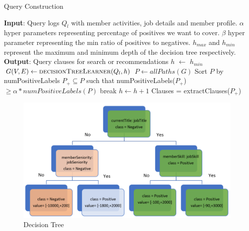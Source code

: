 \begin{algorithm}
\caption{Query Construction}\label{alg:query-construction}
\begin{algorithmic}[1]

    \State \textbf{Input}: Query logs $Q_l$ with member activities, job details
    and member profile. $\alpha$ hyper parameters representing
    percentage of positives we want to cover. $\beta$ hyper parameter
    representing the min ratio of positives to negatives. $h_{max}$ and $h_{min}$ represent
    the maximum and minimum depth of the decision tree respectively.
    \State \textbf{Output}: Query clauses for search or recommendations
        \State $h$ $\gets$ $h_{min}$
            \State $G(V,E) \gets \Call{decisionTreeLearner}{Q_l, h}$
            \State $P \gets allPaths(G)$
            \State Sort $P$ by numPositiveLabels
            \State $P_{+} \subseteq P$ such that numPositiveLabels($P_+$) $\geq \alpha * numPositiveLabels(P)$
            \State 
                \State break     
            \EndIf
            $h \gets h + 1$
            \State 
        \EndWhile
        Clauses = extractClauses($P_+$)

    \EndFunction

\end{algorithmic}
\end{algorithm}



\begin{figure}
\centering
    \includegraphics[width=\textwidth]{decision-tree-final.png}
\caption{Decision Tree}
\label{fig:decision-tree}
\end{figure}
